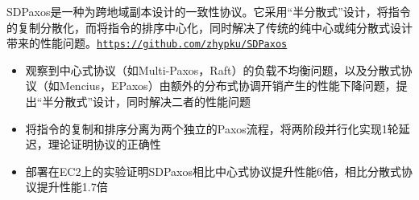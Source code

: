 \begin{itemize}[leftmargin=*]
{          SDPaxos是一种为跨地域副本设计的一致性协议。它采用“半分散式”设计，将指令的复制分散化，而将指令的排序中心化，同时解决了传统的纯中心或纯分散式设计带来的性能问题。\texttt{\url{https://github.com/zhypku/SDPaxos}}
          \vspace{-5pt}
          \begin{itemize}[leftmargin=*]
            \item 观察到中心式协议（如Multi-Paxos，Raft）的负载不均衡问题，以及分散式协议（如Mencius，EPaxos）由额外的分布式协调开销产生的性能下降问题，提出“半分散式”设计，同时解决二者的性能问题
            \item 将指令的复制和排序分离为两个独立的Paxos流程，将两阶段并行化实现1轮延迟，理论证明协议的正确性
            \item 部署在EC2上的实验证明SDPaxos相比中心式协议提升性能6倍，相比分散式协议提升性能1.7倍
          \end{itemize}
      }

\end{itemize}
